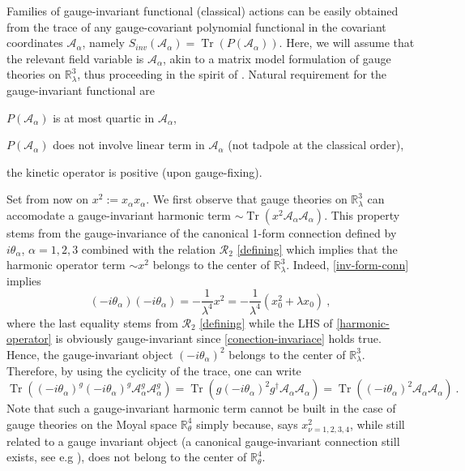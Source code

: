 \documentclass[a4paper,11pt,twoside]{article}
\makeatletter
\numberwithin{equation}{section}
\DeclareMathOperator{\tr}{Tr}
\newcommand{\labitem}[2]{\def\@itemlabel{\textbf{#1}}\item\def\@currentlabel{#1}\label{#2}}
\theoremstyle{nonumberplain}
\newcounter{and}
\makeatother
\begin{document}
Families of gauge-invariant functional (classical) actions can be easily obtained from the trace of any gauge-covariant polynomial functional in the covariant coordinates $\mathcal{A}_\alpha$, namely $S_{inv}(\mathcal{A}_\alpha)=\tr\left(P(\mathcal{A}_\alpha)\right)$. Here, we will assume that the relevant field variable is $\mathcal{A}_\alpha$, akin to a matrix model formulation of gauge theories on $\mathbb{R}^3_\lambda$, thus proceeding in the spirit of \cite{MVW13}. Natural requirement for the gauge-invariant functional are%
%
\begin{description}
\labitem{(i)}{(i)} $P(\mathcal{A}_\alpha)$ is at most quartic in $\mathcal{A}_\alpha$,
\labitem{(ii)}{(ii)} $P(\mathcal{A}_\alpha)$ does not involve linear term in $\mathcal{A}_\alpha$ (not tadpole at the classical order),
\labitem{(iii)}{(iii)} the kinetic operator is positive (upon gauge-fixing).
\end{description}
%
Set from now on $x^2 := x_\alpha x_\alpha$. We first observe that gauge theories on $\mathbb{R}^3_\lambda$ can accomodate a gauge-invariant harmonic term $\sim\tr(x^2\mathcal{A}_\alpha \mathcal{A}_\alpha)$. This property stems from the gauge-invariance of the canonical 1-form connection defined by $i\theta_\alpha$, $\alpha=1,2,3$ combined with the relation $\mathcal{R}_2$ \eqref{defining} which implies that the harmonic operator term $\sim x^2$ belongs to the center of $\mathbb{R}^3_\lambda$. Indeed, \eqref{inv-form-conn} implies%
%
\begin{equation}
(-i\theta_\alpha)(-i\theta_\alpha) = -\frac{1}{\lambda^4}x^2 = -\frac{1}{\lambda^4}(x_0^2+\lambda x_0) \ , \label{harmonic-operator}
\end{equation}
%
where the last equality stems from $\mathcal{R}_2$ \eqref{defining} while the LHS of \eqref{harmonic-operator} is obviously gauge-invariant since \eqref{conection-invariace} holds true. Hence, the gauge-invariant object $(-i\theta_\alpha)^2$ belongs to the center of $\mathbb{R}^3_\lambda$. Therefore, by using the cyclicity of the trace, one can write%
%
\begin{equation}
\tr\left( (-i\theta_\alpha)^g (-i\theta_\alpha)^g \mathcal{A}^g_\alpha \mathcal{A}^g_\alpha \right) = 
\tr\left( g (-i\theta_\alpha)^2 g^\dag \mathcal{A}_\alpha \mathcal{A}_\alpha \right) = 
\tr\left( (-i\theta_\alpha)^2 \mathcal{A}_\alpha \mathcal{A}_\alpha \right) \ . 
\label{harm-inv-dem}
\end{equation}
%
Note that such a gauge-invariant harmonic term cannot be built in the case of gauge theories on the Moyal space $\mathbb{R}^4_\theta$ \cite{GWW} simply because, says $x_{\nu=1,2,3,4}^2$, while still related to a gauge invariant object (a canonical gauge-invariant connection still exists, see e.g \cite{cgmw-20}), does not belong to the center of $\mathbb{R}^4_\theta$. \par%
\end{document}
